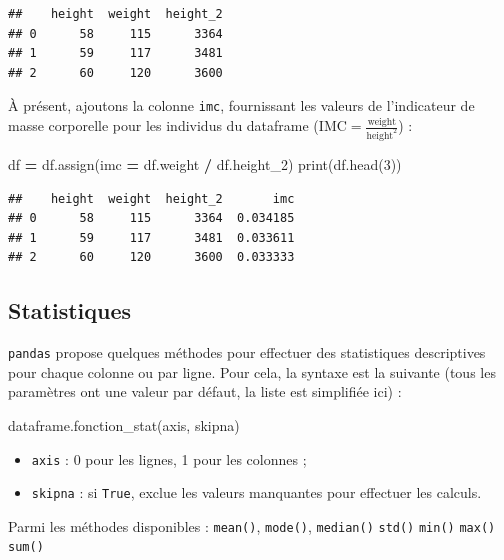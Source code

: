 \documentclass[12pt,]{book}
\newenvironment{Shaded}{\begin{snugshade}}{\end{snugshade}}
\newcommand{\DecValTok}[1]{\textcolor[rgb]{0.00,0.00,0.81}{#1}}
\newcommand{\OperatorTok}[1]{\textcolor[rgb]{0.81,0.36,0.00}{\textbf{#1}}}
\newcommand{\BuiltInTok}[1]{#1}
\newcommand{\NormalTok}[1]{#1}
\providecommand{\tightlist}{%
  \setlength{\itemsep}{0pt}\setlength{\parskip}{0pt}}
\numberwithin{equation}{section}
\numberwithin{countremarque}{section}
\begin{document}
\begin{lstlisting}
##    height  weight  height_2
## 0      58     115      3364
## 1      59     117      3481
## 2      60     120      3600
\end{lstlisting}

À présent, ajoutons la colonne \texttt{imc}, fournissant les valeurs de
l'indicateur de masse corporelle pour les individus du dataframe
(\(\text{IMC} = \frac{\text{weight}}{\text{height}^2}\)) :

\begin{Shaded}
\begin{Highlighting}[]
\NormalTok{df }\OperatorTok{=}\NormalTok{ df.assign(imc }\OperatorTok{=}\NormalTok{ df.weight }\OperatorTok{/}\NormalTok{ df.height_2)}
\BuiltInTok{print}\NormalTok{(df.head(}\DecValTok{3}\NormalTok{))}
\end{Highlighting}
\end{Shaded}

\begin{lstlisting}
##    height  weight  height_2       imc
## 0      58     115      3364  0.034185
## 1      59     117      3481  0.033611
## 2      60     120      3600  0.033333
\end{lstlisting}

\subsection{Statistiques}\label{statistiques}

\texttt{pandas} propose quelques méthodes pour effectuer des
statistiques descriptives pour chaque colonne ou par ligne. Pour cela,
la syntaxe est la suivante (tous les paramètres ont une valeur par
défaut, la liste est simplifiée ici) :

\begin{Shaded}
\begin{Highlighting}[]
\NormalTok{dataframe.fonction_stat(axis, skipna)}
\end{Highlighting}
\end{Shaded}

\begin{itemize}
\tightlist
\item
  \texttt{axis} : 0 pour les lignes, 1 pour les colonnes ;
\item
  \texttt{skipna} : si \texttt{True}, exclue les valeurs manquantes pour
  effectuer les calculs.
\end{itemize}

Parmi les méthodes disponibles : \texttt{mean()}, \texttt{mode()},
\texttt{median()} \texttt{std()} \texttt{min()} \texttt{max()}
\texttt{sum()}
\end{document}
